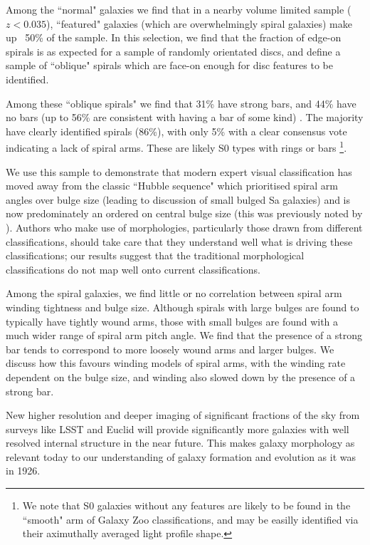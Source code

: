 \documentclass[usenatbib]{mn2e}
\begin{document}
Among the ``normal" galaxies we find that in a nearby volume limited sample ($z<0.035$), ``featured" galaxies (which are overwhelmingly spiral galaxies) make up ~50\% of the sample. In this selection, we find that the fraction of edge-on spirals is as expected for a sample of randomly orientated discs, and define a sample of ``oblique" spirals which are face-on enough for disc features to be identified. 

 Among these ``oblique spirals" we find that {31\%} have strong bars, and {44\%} have no bars (up to 56\% are consistent with having a bar of some kind) . The majority have clearly identified spirals ({86\%}), with only {5\%} with a clear consensus vote indicating a lack of spiral arms. These are likely S0 types with rings or bars \footnote{We note that S0 galaxies without any features are likely to be found in the ``smooth" arm of Galaxy Zoo classifications, and may be easilly identified via their aximuthally averaged light profile shape.}. 
 
 We use this sample to demonstrate that modern expert visual classification has moved away from the classic ``Hubble sequence" which prioritised spiral arm angles over bulge size (leading to discussion of small bulged Sa galaxies) and is now predominately an ordered on central bulge size (this was previously noted by \citealt{Willett2013}). Authors who make use of morphologies, particularly those drawn from different classifications, should take care that they understand well what is driving these classifications; our results suggest that the traditional morphological classifications do not map well onto current classifications. 
 
Among the spiral galaxies, we find little or no correlation between spiral arm winding tightness and bulge size. Although spirals with large bulges are found to typically have tightly wound  arms, those with small bulges are found with a much wider range of spiral arm pitch angle. We find that the presence of a strong bar tends to correspond to more loosely wound arms and larger bulges. We discuss how this favours winding models of spiral arms, with the winding rate dependent on the bulge size, and winding also slowed down by the presence of a strong bar. 

 New higher resolution and deeper imaging of significant fractions of the sky from surveys like LSST and Euclid will provide significantly more galaxies with well resolved internal structure in the near future. This makes galaxy morphology as relevant today to our understanding of galaxy formation and evolution as it was in 1926. %
  
\end{document}
